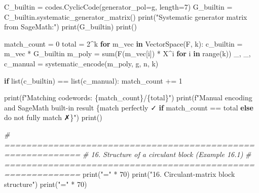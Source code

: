 \documentclass[
]{article}
\newenvironment{Shaded}{}{}
\newcommand{\BuiltInTok}[1]{\textcolor[rgb]{0.00,0.50,0.00}{#1}}
\newcommand{\CommentTok}[1]{\textcolor[rgb]{0.38,0.63,0.69}{\textit{#1}}}
\newcommand{\ControlFlowTok}[1]{\textcolor[rgb]{0.00,0.44,0.13}{\textbf{#1}}}
\newcommand{\DecValTok}[1]{\textcolor[rgb]{0.25,0.63,0.44}{#1}}
\newcommand{\KeywordTok}[1]{\textcolor[rgb]{0.00,0.44,0.13}{\textbf{#1}}}
\newcommand{\NormalTok}[1]{#1}
\newcommand{\OperatorTok}[1]{\textcolor[rgb]{0.40,0.40,0.40}{#1}}
\newcommand{\SpecialCharTok}[1]{\textcolor[rgb]{0.25,0.44,0.63}{#1}}
\newcommand{\SpecialStringTok}[1]{\textcolor[rgb]{0.73,0.40,0.53}{#1}}
\newcommand{\StringTok}[1]{\textcolor[rgb]{0.25,0.44,0.63}{#1}}
\begin{document}
\begin{Shaded}
\begin{Highlighting}[]
\NormalTok{C\_builtin }\OperatorTok{=}\NormalTok{ codes.CyclicCode(generator\_pol}\OperatorTok{=}\NormalTok{g, length}\OperatorTok{=}\DecValTok{7}\NormalTok{)}
\NormalTok{G\_builtin }\OperatorTok{=}\NormalTok{ C\_builtin.systematic\_generator\_matrix()}
\BuiltInTok{print}\NormalTok{(}\StringTok{"Systematic generator matrix from SageMath:"}\NormalTok{)}
\BuiltInTok{print}\NormalTok{(G\_builtin)}
\BuiltInTok{print}\NormalTok{()}

\NormalTok{match\_count }\OperatorTok{=} \DecValTok{0}
\NormalTok{total }\OperatorTok{=} \DecValTok{2}\OperatorTok{\^{}}\NormalTok{k}
\ControlFlowTok{for}\NormalTok{ m\_vec }\KeywordTok{in}\NormalTok{ VectorSpace(F, k):}
\NormalTok{    c\_builtin }\OperatorTok{=}\NormalTok{ m\_vec }\OperatorTok{*}\NormalTok{ G\_builtin}
\NormalTok{    m\_poly }\OperatorTok{=} \BuiltInTok{sum}\NormalTok{(F(m\_vec[i]) }\OperatorTok{*}\NormalTok{ X}\OperatorTok{\^{}}\NormalTok{i }\ControlFlowTok{for}\NormalTok{ i }\KeywordTok{in} \BuiltInTok{range}\NormalTok{(k))}
\NormalTok{    \_, \_, c\_manual }\OperatorTok{=}\NormalTok{ systematic\_encode(m\_poly, g, n, k)}

    \ControlFlowTok{if} \BuiltInTok{list}\NormalTok{(c\_builtin) }\OperatorTok{==} \BuiltInTok{list}\NormalTok{(c\_manual):}
\NormalTok{        match\_count }\OperatorTok{+=} \DecValTok{1}

\BuiltInTok{print}\NormalTok{(}\SpecialStringTok{f"Matching codewords: }\SpecialCharTok{\{}\NormalTok{match\_count}\SpecialCharTok{\}}\SpecialStringTok{/}\SpecialCharTok{\{}\NormalTok{total}\SpecialCharTok{\}}\SpecialStringTok{"}\NormalTok{)}
\BuiltInTok{print}\NormalTok{(}\SpecialStringTok{f"Manual encoding and SageMath built{-}in result }\SpecialCharTok{\{}\StringTok{\textquotesingle{}match perfectly ✓\textquotesingle{}} \ControlFlowTok{if}\NormalTok{ match\_count }\OperatorTok{==}\NormalTok{ total }\ControlFlowTok{else} \StringTok{\textquotesingle{}do not fully match ✗\textquotesingle{}}\SpecialCharTok{\}}\SpecialStringTok{"}\NormalTok{)}
\BuiltInTok{print}\NormalTok{()}

\CommentTok{\# ============================================================}
\CommentTok{\# 16. Structure of a circulant block (Example 16.1)}
\CommentTok{\# ============================================================}
\BuiltInTok{print}\NormalTok{(}\StringTok{"="} \OperatorTok{*} \DecValTok{70}\NormalTok{)}
\BuiltInTok{print}\NormalTok{(}\StringTok{"16. Circulant{-}matrix block structure"}\NormalTok{)}
\BuiltInTok{print}\NormalTok{(}\StringTok{"="} \OperatorTok{*} \DecValTok{70}\NormalTok{)}


\end{Highlighting}
\end{Shaded}
\end{document}
